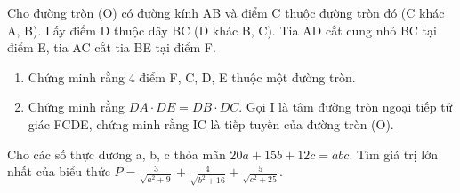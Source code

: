 \begin{ex}
	Cho đường tròn (O) có đường kính AB và điểm C thuộc đường tròn đó (C khác A, B). Lấy điểm D thuộc dây BC (D khác B, C). Tia AD cắt cung nhỏ BC tại điểm E, tia AC cắt tia BE tại điểm F.
	\begin{enumerate}
		\item[a)] Chứng minh rằng 4 điểm F, C, D, E thuộc một đường tròn.
		\item[b)] Chứng minh rằng $DA \cdot DE = DB \cdot DC$. Gọi I là tâm đường tròn ngoại tiếp tứ giác FCDE, chứng minh rằng IC là tiếp tuyến của đường tròn (O).
	\end{enumerate}
\end{ex}

\begin{ex}
	Cho các số thực dương a, b, c thỏa mãn $20a + 15b + 12c = abc$.
	Tìm giá trị lớn nhất của biểu thức $P = \frac{3}{\sqrt{a^2+9}} + \frac{4}{\sqrt{b^2+16}} + \frac{5}{\sqrt{c^2+25}}$.
\end{ex}

